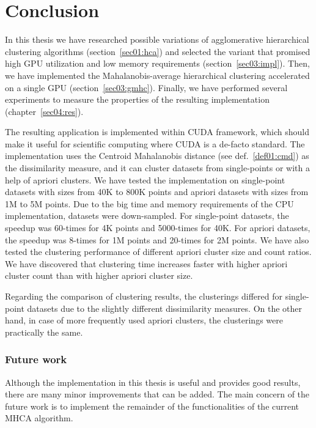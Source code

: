 \chapter*{Conclusion}

In this thesis we have researched possible variations of agglomerative hierarchical clustering algorithms (section~\ref{sec01:hca}) and selected the variant that promised high GPU utilization and low memory requirements (section~\ref{sec03:impl}). Then, we have implemented the Mahalanobis-average hierarchical clustering accelerated on a single GPU (section~\ref{sec03:gmhc}). Finally, we have performed several experiments to measure the properties of the resulting implementation (chapter~\ref{sec04:res}). 

The resulting application is implemented within CUDA framework, which should make it useful for scientific computing where CUDA is a de-facto standard. The implementation uses the Centroid Mahalanobis distance (see def.~\ref{def01:cmd}) as the dissimilarity measure, and it can cluster datasets from single-points or with a help of apriori clusters. We have tested the implementation on single-point datasets with sizes from 40K to 800K points and apriori datasets with sizes from 1M to 5M points. Due to the big time and memory requirements of the CPU implementation, datasets were down-sampled. For single-point datasets, the speedup was 60-times for 4K points and 5000-times for 40K. For apriori datasets, the speedup was 8-times for 1M points and 20-times for 2M points. We have also tested the clustering performance of different apriori cluster size and count ratios. We have discovered that clustering time increases faster with higher apriori cluster count than with higher apriori cluster size.

Regarding the comparison of clustering results, the clusterings differed for sin\-gle-point datasets due to the slightly different dissimilarity measures. On the other hand, in case of more frequently used apriori clusters, the clusterings were practically the same.

\subsection*{Future work}

Although the implementation in this thesis is useful and provides good results, there are many minor improvements that can be added.
The main concern of the future work is to implement the remainder of the functionalities of the current MHCA algorithm.

